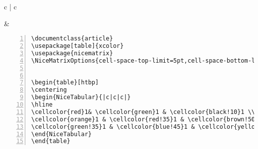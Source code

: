 \begin{tabular}{c | c}
\begin{minipage}[m]{0.4\textwidth}
\end{minipage}
&
\begin{minipage}[m]{0.55\textwidth}
\begin{lstlisting}[numberstyle=\zebra{green!15}{yellow!15},numbers=left,basicstyle=\footnotesize] 
\documentclass{article}
\usepackage[table]{xcolor}
\usepackage{nicematrix}
\NiceMatrixOptions{cell-space-top-limit=5pt,cell-space-bottom-limit=5pt}


\begin{table}[htbp]
\centering
\begin{NiceTabular}{|c|c|c|} 
\hline
\cellcolor{red}1& \cellcolor{green}1 & \cellcolor{black!10}1 \\ \hline 
\cellcolor{orange}1 & \cellcolor{red!35}1 & \cellcolor{brown!50}1 \\ \hline
\cellcolor{green!35}1 & \cellcolor{blue!45}1 & \cellcolor{yellow}1 \\ \hline
\end{NiceTabular}
\end{table}

\end{lstlisting}
\end{minipage}
\end{tabular}



